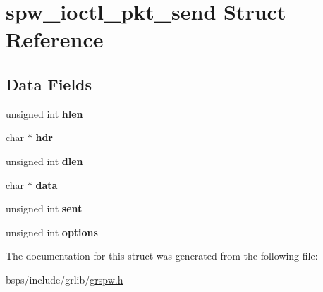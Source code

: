 \hypertarget{structspw__ioctl__pkt__send}{}\section{spw\+\_\+ioctl\+\_\+pkt\+\_\+send Struct Reference}
\label{structspw__ioctl__pkt__send}
\subsection*{Data Fields}
\begin{DoxyCompactItemize}
\item 
\mbox{\label{structspw__ioctl__pkt__send_a9ac76c3dc55ae17c4802aeb76853ddb1}} 
unsigned int {\bfseries hlen}
\item 
\mbox{\label{structspw__ioctl__pkt__send_a66a21fc734ac4ef865a9ac620eece053}} 
char $\ast$ {\bfseries hdr}
\item 
\mbox{\label{structspw__ioctl__pkt__send_a1f12ca0ac61584777014c20e7f7c0472}} 
unsigned int {\bfseries dlen}
\item 
\mbox{\label{structspw__ioctl__pkt__send_a99095e20633d290a8768bcdc782268f4}} 
char $\ast$ {\bfseries data}
\item 
\mbox{\label{structspw__ioctl__pkt__send_addf05b941613db8e5b26c05fb65b81b0}} 
unsigned int {\bfseries sent}
\item 
\mbox{\label{structspw__ioctl__pkt__send_a583112fcfec77b446c9f5487b83cb556}} 
unsigned int {\bfseries options}
\end{DoxyCompactItemize}


The documentation for this struct was generated from the following file\+:\begin{DoxyCompactItemize}
\item 
bsps/include/grlib/\mbox{\hyperlink{grspw_8h}{grspw.\+h}}\end{DoxyCompactItemize}
